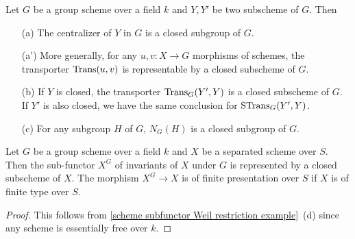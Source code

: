 \begin{corollary}\label{scheme k-group transporter representable by closed}
Let $G$ be a group scheme over a field $k$ and $Y,Y'$ be two subscheme of $G$. Then
\begin{enumerate}
    \item[(a)] The centralizer of $Y$ in $G$ is a closed subgroup of $G$.
    \item[(a')] More generally, for any $u,v:X\to G$ morphisms of schemes, the transporter $\mathrm{Trans}(u,v)$ is representable by a closed subscheme of $G$.
    \item[(b)] If $Y$ is closed, the transporter $\mathrm{Trans}_G(Y',Y)$ is a closed subscheme of $G$. If $Y'$ is also closed, we have the same conclusion for $\mathrm{STrans}_G(Y',Y)$.
    \item[(c)] For any subgroup $H$ of $G$, $N_G(H)$ is a closed subgroup of $G$.
\end{enumerate}
\end{corollary}

\begin{corollary}\label{scheme k-group invariant subscheme exist}
Let $G$ be a group scheme over a field $k$ and $X$ be a separated scheme over $S$. Then the sub-functor $X^G$ of invariants of $X$ under $G$ is represented by a closed subscheme of $X$. The morphism $X^G\to X$ is of finite presentation over $S$ if $X$ is of finite type over $S$.
\end{corollary}
\begin{proof}
This follows from \cref{scheme subfunctor Weil restriction example}~(d) since any scheme is essentially free over $k$.
\end{proof}

